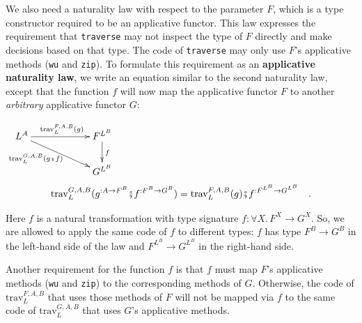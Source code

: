 We also need a naturality law with respect to the parameter $F$,
which is a type constructor required to be an applicative functor.
This law expresses the requirement that \lstinline!traverse! may
not inspect the type of $F$ directly and make decisions based on
that type. The code of \lstinline!traverse! may only use $F$\textsf{'}s applicative
methods (\lstinline!wu! and \lstinline!zip!). To formulate this
requirement as an \textbf{applicative naturality law},
we write an equation similar to the second naturality law, except
that the function $f$ will now map the applicative functor $F$ to
another \emph{arbitrary} applicative functor $G$:
\noindent \begin{center}
$\xymatrix{\xyScaleY{1.7pc}\xyScaleX{5.0pc}L^{A}\ar[rd]\sb(0.4){\text{trav}_{L}^{G,A,B}(g\bef f)~~}\ar[r]\sp(0.5){\text{trav}_{L}^{F,A,B}(g)} & F^{L^{B}}\ar[d]\sp(0.45){f}\\
 & G^{L^{B}}
}
$
\begin{equation}
\text{trav}_{L}^{G,A,B}(g^{:A\rightarrow F^{B}}\bef f^{:F^{B}\rightarrow G^{B}})=\text{trav}_{L}^{F,A,B}(g)\bef f^{:F^{L^{B}}\rightarrow G^{L^{B}}}\quad.\label{eq:traverse-applicative-naturality-law}
\end{equation}
\par\end{center}

\begin{flushleft}
Here $f$ is a natural transformation with type signature $f:\forall X.\,F^{X}\rightarrow G^{X}$.
So, we are allowed to apply the same code of $f$ to different types:
$f$ has type $F^{B}\rightarrow G^{B}$ in the left-hand side of the
law and $F^{L^{B}}\rightarrow G^{L^{B}}$ in the right-hand side.
\par\end{flushleft}

Another requirement for the function $f$ is that $f$ must map $F$\textsf{'}s
applicative methods (\lstinline!wu! and \lstinline!zip!) to the
corresponding methods of $G$. Otherwise, the code of $\text{trav}_{L}^{F,A,B}$
that uses those methods of $F$ will not be mapped via $f$ to the
same code of $\text{trav}_{L}^{G,A,B}$ that uses $G$\textsf{'}s applicative
methods. 

